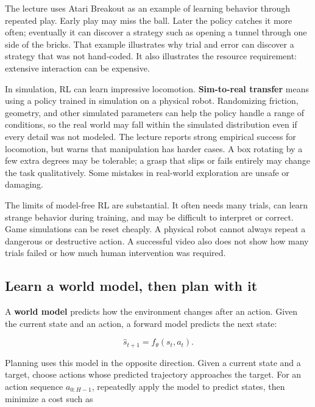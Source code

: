 The lecture uses Atari Breakout as an example of learning behavior through repeated play. Early play may miss the ball. Later the policy catches it more often; eventually it can discover a strategy such as opening a tunnel through one side of the bricks. That example illustrates why trial and error can discover a strategy that was not hand-coded. It also illustrates the resource requirement: extensive interaction can be expensive.

In simulation, RL can learn impressive locomotion. \textbf{Sim-to-real transfer} means using a policy trained in simulation on a physical robot. Randomizing friction, geometry, and other simulated parameters can help the policy handle a range of conditions, so the real world may fall within the simulated distribution even if every detail was not modeled. The lecture reports strong empirical success for locomotion, but warns that manipulation has harder cases. A box rotating by a few extra degrees may be tolerable; a grasp that slips or fails entirely may change the task qualitatively. Some mistakes in real-world exploration are unsafe or damaging.

The limits of model-free RL are substantial. It often needs many trials, can learn strange behavior during training, and may be difficult to interpret or correct. Game simulations can be reset cheaply. A physical robot cannot always repeat a dangerous or destructive action. A successful video also does not show how many trials failed or how much human intervention was required.

\subsection{Learn a world model, then plan with it}\label{04-visual-computing-ii-ch034-learn-a-world-model-then-plan-with-it}

\hypertarget{04-visual-computing-ii-ch034-learn-a-world-model-then-plan-with-it}{}

A \textbf{world model} predicts how the environment changes after an action. Given the current state and an action, a forward model predicts the next state:

\[
\hat{s}_{t+1}=f_\theta(s_t,a_t).
\]

Planning uses this model in the opposite direction. Given a current state and a target, choose actions whose predicted trajectory approaches the target. For an action sequence \(a_{0:H-1}\), repeatedly apply the model to predict states, then minimize a cost such as

